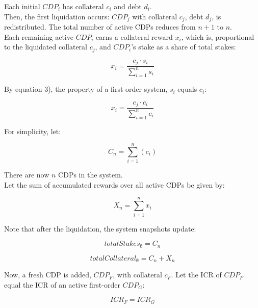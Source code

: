 \documentclass[reqno]{article}
\begin{document}
Each initial $CDP_i$ has collateral $c_i$ and debt $d_i$.\\

Then, the first liquidation occurs: $CDP_j$ with collateral $c_j$, debt $d_j$, is redistributed. The total number of active CDPs reduces from $n+1$ to $n$.\\

Each remaining active $CDP_i$ earns a collateral reward $x_i$, which is, proportional to the liquidated collateral $c_j$, and $CDP_i$’s stake as a share of total stakes:

\begin{equation} 
    x_i=\frac{c_j \cdot s_i}{\sum\limits^n_{i=1}s_i}
\end{equation}

\bigskip
By equation 3), the property of a first-order system, $s_i$ equals $c_i$:

\begin{equation} 
    x_i=\frac{c_j \cdot c_i}{\sum\limits^n_{i=1}c_i}
\end{equation}

\bigskip
For simplicity, let:

\begin{equation} 
    C_n=\sum^n_{i=1}(c_i)
\end{equation}

\bigskip
There are now $n$ CDPs in the system.\\

Let the sum of accumulated rewards over all active CDPs be given by: 

\begin{equation} 
    X_n=\sum^n_{i=1}x_i
\end{equation}

\bigskip
Note that after the liquidation, the system snapshots update:

\begin{equation} 
    totalStakes_\emptyset=C_n
\end{equation}

\begin{equation} 
    totalCollateral_\emptyset=C_n+X_n
\end{equation}

\bigskip
Now, a fresh CDP is added, $CDP_F$, with collateral $c_F$.  Let the ICR of $CDP_F$ equal the ICR of an active first-order $CDP_G$:

\begin{equation} 
    ICR_F=ICR_G
\end{equation}
\end{document}
